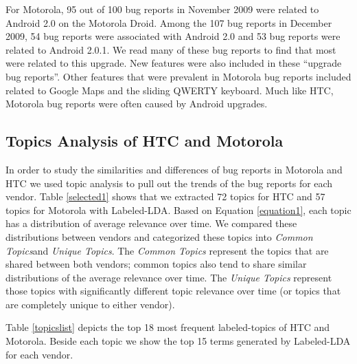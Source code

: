 \documentclass[10pt, conference, compsocconf]{IEEEtran}
\begin{document}
For Motorola,  95 out of 100 bug
reports in November 2009 were related to Android 2.0 on the Motorola Droid.
Among the 107 bug reports in December 2009, 54 bug reports were
associated with Android 2.0 and 53 bug reports were related to Android
2.0.1. 
We read many of these bug reports to find that most were related to this upgrade.
New features were also included in these ``upgrade bug reports''.
Other features that were prevalent in Motorola bug reports included
related to Google Maps and the sliding QWERTY keyboard. 
Much like HTC, Motorola bug reports were often caused by Android upgrades.


\subsection{Topics Analysis of HTC and Motorola}

In order to study the similarities and differences of bug reports in
Motorola and HTC we used topic analysis to pull out the trends of the
bug reports for each vendor.
Table \ref{selected1} shows that we extracted 72 topics for HTC and
57 topics for Motorola with Labeled-LDA.
Based on Equation \ref{equation1}, each topic has a distribution of
average relevance over time. 
We compared these distributions between vendors and categorized these
topics
into 
\textit{Common Topics}and \textit{Unique Topics}.
The \textit{Common Topics} represent the topics that are shared
between both vendors; common topics also tend to share 
similar distributions of the average relevance over
time.
The \textit{Unique Topics} represent those topics with significantly
different topic relevance over time (or topics that are completely
unique to either vendor).

Table \ref{topicslist} depicts 
the top 18 most frequent labeled-topics of HTC and
Motorola.
Beside each topic we show the top 15 terms generated by Labeled-LDA for
each vendor. 
\end{document}
